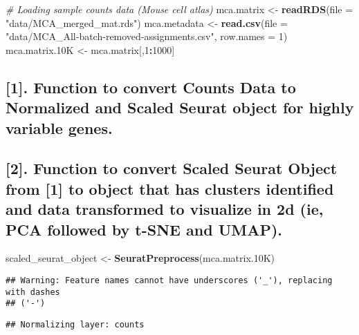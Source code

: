 \documentclass[
]{article}
\newenvironment{Shaded}{\begin{snugshade}}{\end{snugshade}}
\newcommand{\AttributeTok}[1]{\textcolor[rgb]{0.13,0.29,0.53}{#1}}
\newcommand{\CommentTok}[1]{\textcolor[rgb]{0.56,0.35,0.01}{\textit{#1}}}
\newcommand{\DecValTok}[1]{\textcolor[rgb]{0.00,0.00,0.81}{#1}}
\newcommand{\FloatTok}[1]{\textcolor[rgb]{0.00,0.00,0.81}{#1}}
\newcommand{\FunctionTok}[1]{\textcolor[rgb]{0.13,0.29,0.53}{\textbf{#1}}}
\newcommand{\NormalTok}[1]{#1}
\newcommand{\OtherTok}[1]{\textcolor[rgb]{0.56,0.35,0.01}{#1}}
\newcommand{\SpecialCharTok}[1]{\textcolor[rgb]{0.81,0.36,0.00}{\textbf{#1}}}
\newcommand{\StringTok}[1]{\textcolor[rgb]{0.31,0.60,0.02}{#1}}
\begin{document}
\begin{Shaded}
\begin{Highlighting}[]
\CommentTok{\# Loading sample counts data (Mouse cell atlas)}
\NormalTok{mca.matrix }\OtherTok{\textless{}{-}} \FunctionTok{readRDS}\NormalTok{(}\AttributeTok{file =} \StringTok{"data/MCA\_merged\_mat.rds"}\NormalTok{)}
\NormalTok{mca.metadata }\OtherTok{\textless{}{-}} \FunctionTok{read.csv}\NormalTok{(}\AttributeTok{file =} \StringTok{"data/MCA\_All{-}batch{-}removed{-}assignments.csv"}\NormalTok{, }\AttributeTok{row.names =} \DecValTok{1}\NormalTok{)}
\NormalTok{mca.matrix}\FloatTok{.10}\NormalTok{K }\OtherTok{\textless{}{-}}\NormalTok{ mca.matrix[,}\DecValTok{1}\SpecialCharTok{:}\DecValTok{1000}\NormalTok{]}
\end{Highlighting}
\end{Shaded}

\subsection{{[}1{]}. Function to convert Counts Data to Normalized and
Scaled Seurat object for highly variable
genes.}\label{function-to-convert-counts-data-to-normalized-and-scaled-seurat-object-for-highly-variable-genes.}

\subsection{{[}2{]}. Function to convert Scaled Seurat Object from
{[}1{]} to object that has clusters identified and data transformed to
visualize in 2d (ie, PCA followed by t-SNE and
UMAP).}\label{function-to-convert-scaled-seurat-object-from-1-to-object-that-has-clusters-identified-and-data-transformed-to-visualize-in-2d-ie-pca-followed-by-t-sne-and-umap.}

\begin{Shaded}
\begin{Highlighting}[]
\NormalTok{scaled\_seurat\_object }\OtherTok{\textless{}{-}} \FunctionTok{SeuratPreprocess}\NormalTok{(mca.matrix}\FloatTok{.10}\NormalTok{K)}
\end{Highlighting}
\end{Shaded}

\begin{verbatim}
## Warning: Feature names cannot have underscores ('_'), replacing with dashes
## ('-')
\end{verbatim}

\begin{verbatim}
## Normalizing layer: counts
\end{verbatim}
\end{document}
